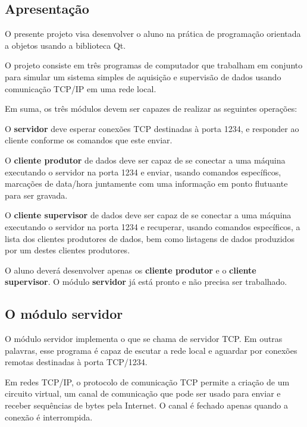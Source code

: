 \subsection*{Apresentação}

O presente projeto visa desenvolver o aluno na prática de programação orientada a objetos usando a biblioteca Qt.

O projeto consiste em três programas de computador que trabalham em conjunto para simular um sistema simples de aquisição e supervisão de dados usando comunicação T\+C\+P/\+IP em uma rede local.

Em suma, os três módulos devem ser capazes de realizar as seguintes operações\+:


\begin{DoxyItemize}
\item O {\bfseries servidor} deve esperar conexões T\+CP destinadas à porta 1234, e responder ao cliente conforme os comandos que este enviar.
\item O {\bfseries cliente produtor} de dados deve ser capaz de se conectar a uma máquina executando o servidor na porta 1234 e enviar, usando comandos específicos, marcações de data/hora juntamente com uma informação em ponto flutuante para ser gravada.
\item O {\bfseries cliente supervisor} de dados deve ser capaz de se conectar a uma máquina executando o servidor na porta 1234 e recuperar, usando comandos específicos, a lista dos clientes produtores de dados, bem como listagens de dados produzidos por um destes clientes produtores.
\end{DoxyItemize}

O aluno deverá desenvolver apenas os {\bfseries cliente produtor} e o {\bfseries cliente supervisor}. O módulo {\bfseries servidor} já está pronto e não precisa ser trabalhado.

\subsection*{O módulo servidor}

O módulo servidor implementa o que se chama de servidor T\+CP. Em outras palavras, esse programa é capaz de escutar a rede local e aguardar por conexões remotas destinadas à porta T\+C\+P/1234.

Em redes T\+C\+P/\+IP, o protocolo de comunicação T\+CP permite a criação de um circuito virtual, um canal de comunicação que pode ser usado para enviar e receber sequências de bytes pela Internet. O canal é fechado apenas quando a conexão é interrompida.

